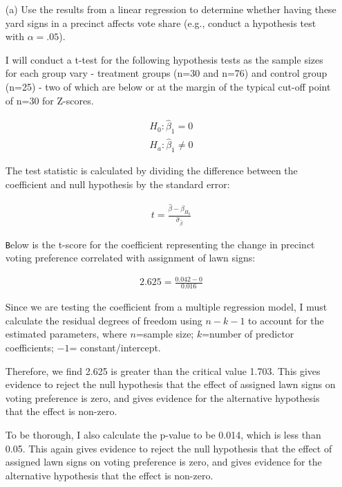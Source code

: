 \documentclass[12pt,letterpaper]{article}
\begin{document}
\vspace{.5cm}
\begin{enumerate}
	\item [(a)] Use the results from a linear regression to determine whether having these yard signs in a precinct affects vote share (e.g., conduct a hypothesis test with $\alpha = .05$).
	
	\noindent I will conduct a t-test for the following hypothesis tests as the sample sizes for each group vary - treatment groups (n=30 and n=76) and control group (n=25) - two of which are below or at the margin of the typical cut-off point of n=30 for Z-scores.
	
	\begin{align*}
		H_0: \hat \beta_1 = 0\\
		H_a: \hat \beta_1 \neq 0
	\end{align*}
	
	\noindent The test statistic is calculated by dividing the difference between the coefficient and null hypothesis by the standard error:

	\begin{align*}
		t = \frac{ \hat \beta - \beta_{H_0}}{\hat \sigma_{\hat \beta}}
	\end{align*}
	
	\texttt Below is the t-score for the coefficient representing the change in precinct voting preference correlated with assignment of lawn signs:
	
	\begin{align*}
		2.625 = \frac{0.042 - 0}{0.016}
	\end{align*}
	
	\noindent Since we are testing the coefficient from a multiple regression model, I must calculate the residual degrees of freedom using $n-k-1$ to account for the estimated parameters, where $n$=sample size; $k$=number of predictor coefficients; $-1$= constant/intercept.
	
	\noindent Therefore, we find 2.625 is greater than the critical value 1.703. This gives evidence to reject the null hypothesis that the effect of assigned lawn signs on voting preference is zero, and gives evidence for the alternative hypothesis that the effect is non-zero.
	
		
	
	\noindent To be thorough, I also calculate the p-value to be 0.014, which is less than 0.05. This again gives evidence to reject the null hypothesis that the effect of assigned lawn signs on voting preference is zero, and gives evidence for the alternative hypothesis that the effect is non-zero.
	

\end{enumerate}
\end{document}
